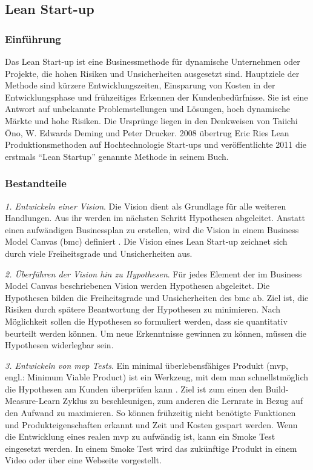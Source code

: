 \subsection{Lean Start-up}
\subsubsection*{Einführung}
Das Lean Start-up ist eine Businessmethode für dynamische Unternehmen oder Projekte, die hohen Risiken und Unsicherheiten ausgesetzt sind. 
Hauptziele der Methode sind kürzere Entwicklungszeiten, Einsparung von Kosten in der Entwicklungsphase und frühzeitiges Erkennen der Kundenbedürfnisse. 
Sie ist eine Antwort auf unbekannte Problemstellungen und Lösungen, hoch dynamische Märkte und hohe Risiken. Die Ursprünge liegen in den Denkweisen von Taiichi Ōno, W. Edwards Deming und Peter Drucker. 
2008 übertrug Eric Ries Lean Produktionsmethoden auf Hochtechnologie Start-ups und veröffentlichte 2011 die erstmals ``Lean Startup'' 
genannte Methode in seinem Buch.


\subsubsection*{Bestandteile}

\textit{1. Entwickeln einer Vision}. Die Vision dient als Grundlage für alle weiteren Handlungen. Aus ihr werden im nächsten Schritt Hypothesen abgeleitet. Anstatt einen aufwändigen Businessplan zu erstellen, wird die Vision in einem Business Model Canvas (\gls{bmc}) definiert \cite{Blank2013}. Die Vision eines Lean Start-up zeichnet sich durch viele Freiheitsgrade und Unsicherheiten aus. 

\textit{2. Überführen der Vision hin zu Hypothesen}. Für jedes Element der im Business Model Canvas beschriebenen Vision werden Hypothesen abgeleitet. Die Hypothesen bilden die Freiheitsgrade und Unsicherheiten des \gls{bmc} ab. Ziel ist, die Risiken durch spätere Beantwortung der Hypothesen zu minimieren. Nach Möglichkeit sollen die Hypothesen so formuliert werden, dass sie quantitativ beurteilt werden können. Um neue Erkenntnisse gewinnen zu können, müssen die Hypothesen widerlegbar sein. 

\textit{3. Entwickeln von \gls{mvp} Tests}. Ein minimal überlebensfähiges Produkt (\gls{mvp}, engl.: Minimum Viable Product) ist ein Werkzeug, mit dem man schnellstmöglich die Hypothesen am Kunden überprüfen kann \cite[93]{Ries2011}. Ziel ist zum einen den Build-Measure-Learn Zyklus zu beschleunigen, zum anderen die Lernrate in Bezug auf den Aufwand zu maximieren. So können frühzeitig nicht benötigte Funktionen und Produkteigenschaften erkannt und Zeit und Kosten gespart werden. Wenn die Entwicklung eines realen \gls{mvp} zu aufwändig ist, kann ein Smoke Test eingesetzt werden. In einem Smoke Test wird das zukünftige Produkt in einem Video oder über eine Webseite vorgestellt.

